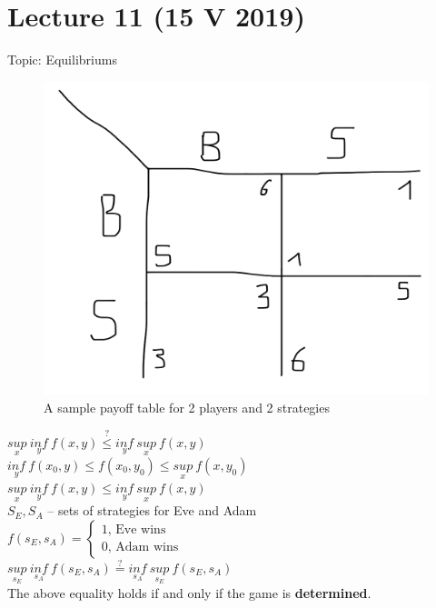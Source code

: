 \section{Lecture 11 (15 V 2019)}
Topic: Equilibriums

\begin{figure}[H]
    \centering
    \caption{A sample payoff table for 2 players and 2 strategies}
    \includegraphics[scale=0.1]{content/graphics/game21.png}
\end{figure}

\noindent
$\underset{x}{sup}\ \underset{y}{inf}\ f(x, y) \stackrel{?}{\leq} \underset{y}{inf}\ \underset{x}{sup}\ f(x, y)$\\

\noindent
$\underset{y}{inf}\ f(x_0, y) \leq f(x_0, y_0) \leq \underset{x}{sup}\ f(x, y_0)$\\

\noindent
$\underset{x}{sup}\ \underset{y}{inf}\ f(x, y) \leq \underset{y}{inf}\ \underset{x}{sup}\ f(x, y)$\\

\noindent
$S_E, S_A$ -- sets of strategies for Eve and Adam\\
$f(s_E, s_A) = \begin{cases}
    1\text{, Eve wins}\\
    0\text{, Adam wins}
\end{cases}$\\

\noindent
$\underset{s_E}{sup}\ \underset{s_A}{inf}\ f(s_E, s_A) \stackrel{?}{=} \underset{s_A}{inf}\ \underset{s_E}{sup}\ f(s_E, s_A)$\\
The above equality holds if and only if the game is \textbf{determined}.\\

